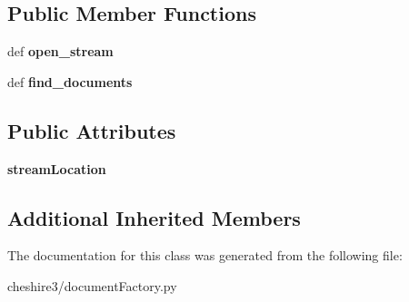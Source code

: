 \subsection*{Public Member Functions}
\begin{DoxyCompactItemize}
\item 
\hypertarget{classcheshire3_1_1document_factory_1_1_cluster_document_stream_a4ac81961dd688e7f6e6b33b70cf62d0f}{def {\bfseries open\-\_\-stream}}\label{classcheshire3_1_1document_factory_1_1_cluster_document_stream_a4ac81961dd688e7f6e6b33b70cf62d0f}

\item 
\hypertarget{classcheshire3_1_1document_factory_1_1_cluster_document_stream_a11fe564ce68788647bddfc0f313def8a}{def {\bfseries find\-\_\-documents}}\label{classcheshire3_1_1document_factory_1_1_cluster_document_stream_a11fe564ce68788647bddfc0f313def8a}

\end{DoxyCompactItemize}
\subsection*{Public Attributes}
\begin{DoxyCompactItemize}
\item 
\hypertarget{classcheshire3_1_1document_factory_1_1_cluster_document_stream_ad0015046b3838861a8e5511ca956900d}{{\bfseries stream\-Location}}\label{classcheshire3_1_1document_factory_1_1_cluster_document_stream_ad0015046b3838861a8e5511ca956900d}

\end{DoxyCompactItemize}
\subsection*{Additional Inherited Members}


The documentation for this class was generated from the following file\-:\begin{DoxyCompactItemize}
\item 
cheshire3/document\-Factory.\-py\end{DoxyCompactItemize}
